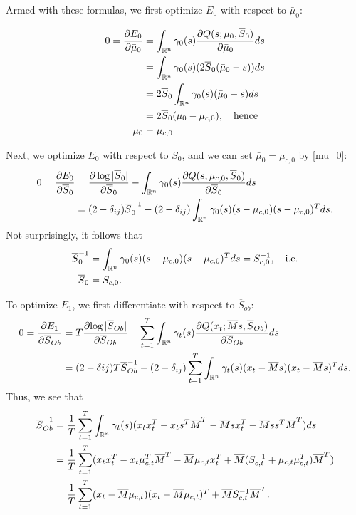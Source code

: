 \documentclass[12pt,leqno]{article}
\begin{document}
Armed with these formulas, we first optimize $E_0$ with respect to $\bar{\mu}_0$: 
 
\begin{align}
0 = \frac{\partial{E_0}}{\partial{\bar{\mu}_0}} &= \int_{{\mathbb R}^n}\gamma_0(s)\frac{\partial{Q(s;\bar{\mu}_0,\overline{S}_0)}}{\partial{\bar{\mu}_0}}ds \notag\\
&= \int_{{\mathbb R}^n}\gamma_0(s)(2\overline{S}_0(\bar{\mu}_0-s))ds\notag\\
&= 2\overline{S}_0\int_{{\mathbb R}^n}\gamma_0(s)(\bar{\mu}_0-s)ds \notag\\
&= 2\overline{S}_0(\bar{\mu}_0-\mu_{c,0}), \quad\text{hence}\notag\\
\bar{\mu}_0 &= \mu_{c,0}\label{mu_0}
\end{align}

Next, we optimize $E_0$ with respect to $\overline{S}_0$, and we can set $\bar{\mu}_0 = \mu_{c,0}$ by \eqref{mu_0}:
\begin{align*}
  0 = \frac{\partial{E_0}}{\partial{\overline{S}_0}} &= \frac{\partial\log|\overline{S}_0|}{\partial\overline{S}_0}
  -\int_{{\mathbb R}^n}\gamma_0(s)\frac{\partial{Q(s;\mu_{c,0},\overline{S}_0)}}{\partial\overline{S}_0}ds \\
&= (2-\delta_{ij})\overline{S}_0^{-1} - (2-\delta_{ij})\int_{{\mathbb R}^n}\gamma_0(s)(s-\mu_{c,0})(s-\mu_{c,0})^Tds.
\end{align*}
Not surprisingly, it follows that
\begin{equation}\label{Sigma_0}
  \begin{split}
    \overline{S}_0^{-1} &= \int_{{\mathbb R}^n}\gamma_0(s)(s-\mu_{c,0})(s-\mu_{c,0})^Tds = S_{c,0}^{-1}, \quad\text{i.e.}\\
    \overline{S}_0 &= S_{c,0}.
  \end{split}
\end{equation}

To optimize $E_1$, we first differentiate with respect to $\overline{S}_{ob}$:
\begin{align*}
  0 = \frac{\partial{E_1}}{\partial{\overline{S}_{Ob}}} &=
  T\frac{\partial{\log|\overline{S}_{Ob}|}}{\partial\overline{S}_{Ob}}
  - \sum_{t=1}^T\int_{{\mathbb R}^n}\gamma_t(s)\frac{\partial{Q(x_t;\overline{M}s,\overline{S}_{Ob})}}{\partial{\overline{S}_{Ob}}}ds \\
  &= (2-\delta{ij})T\overline{S}_{Ob}^{-1} - (2-\delta_{ij})\sum_{t=1}^T
  \int_{{\mathbb R}^n}\gamma_t(s)(x_t-\overline{M}s)(x_t-\overline{M}s)^Tds.
\end{align*}
Thus,  we see that
\begin{equation}\label{S_Ob}
  \begin{split}
    \overline{S}_{Ob}^{-1} &= \frac{1}{T}\sum_{t=1}^T\int_{{\mathbb R}^n}\gamma_t(s)(x_tx_t^T - x_ts^T\overline{M}^T
    - \overline{M}sx_t^T + \overline{M}ss^T\overline{M}^T)ds \\
    &= \frac{1}{T}\sum_{t=1}^T(x_tx_t^T - x_t\mu_{c,t}^T\overline{M}^T - \overline{M}\mu_{c,t}x_t^T +
    \overline{M}(S_{c,t}^{-1}+\mu_{c,t}\mu_{c,t}^T)\overline{M}^T)\\
    &= \frac{1}{T}\sum_{t=1}^T(x_t-\overline{M}\mu_{c,t})(x_t-\overline{M}\mu_{c,t})^T +
    \overline{M}S_{c,t}^{-1}\overline{M}^T.
  \end{split}
\end{equation}
\end{document}
